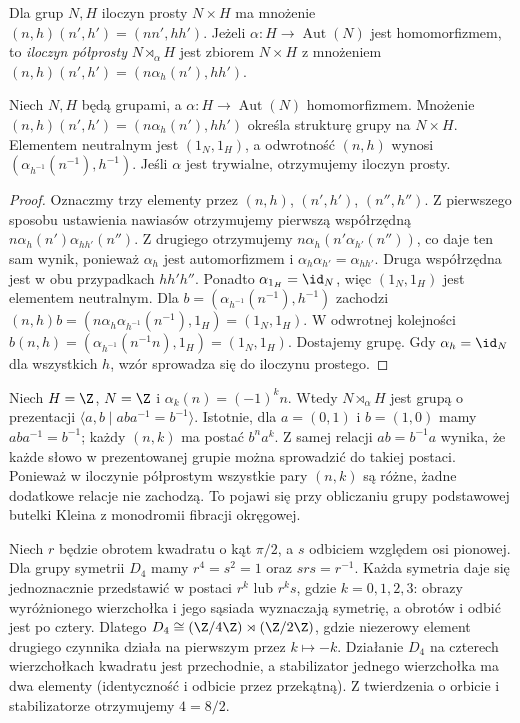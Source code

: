 \begin{definicja}
Dla grup $N,H$ iloczyn prosty $N\times H$ ma mnożenie
$(n,h)(n',h')=(nn',hh')$. Jeżeli
$\alpha:H\to\operatorname{Aut}(N)$ jest homomorfizmem,
to \emph{iloczyn półprosty} $N\rtimes_\alpha H$ jest zbiorem
$N\times H$ z mnożeniem
$(n,h)(n',h')=(n\alpha_h(n'),hh')$.
\end{definicja}
\begin{stwierdzenie}
Niech $N,H$ będą grupami, a
$\alpha:H\to\operatorname{Aut}(N)$ homomorfizmem.
Mnożenie $(n,h)(n',h')=(n\alpha_h(n'),hh')$
określa strukturę grupy na $N\times H$.
Elementem neutralnym jest $(1_N,1_H)$,
a odwrotność $(n,h)$ wynosi
$(\alpha_{h^{-1}}(n^{-1}),h^{-1})$.
Jeśli $\alpha$ jest trywialne, otrzymujemy iloczyn prosty.
\end{stwierdzenie}
\begin{proof}
Oznaczmy trzy elementy przez $(n,h)$, $(n',h')$, $(n'',h'')$.
Z pierwszego sposobu ustawienia nawiasów otrzymujemy
pierwszą współrzędną
$n\alpha_h(n')\alpha_{hh'}(n'')$.
Z drugiego otrzymujemy
$n\alpha_h(n'\alpha_{h'}(n''))$, co daje ten sam wynik,
ponieważ $\alpha_h$ jest automorfizmem i
$\alpha_h\alpha_{h'}=\alpha_{hh'}$.
Druga współrzędna jest w obu przypadkach $hh'h''$.
Ponadto $\alpha_{1_H}=\id_N$, więc $(1_N,1_H)$
jest elementem neutralnym.
Dla $b=(\alpha_{h^{-1}}(n^{-1}),h^{-1})$ zachodzi
$(n,h)b=(n\alpha_h\alpha_{h^{-1}}(n^{-1}),1_H)
=(1_N,1_H)$.
W odwrotnej kolejności
$b(n,h)=(\alpha_{h^{-1}}(n^{-1}n),1_H)=(1_N,1_H)$.
Dostajemy grupę. Gdy $\alpha_h=\id_N$ dla wszystkich $h$,
wzór sprowadza się do iloczynu prostego.
\end{proof}
\begin{przyklad}
Niech $H=\Z$, $N=\Z$ i $\alpha_k(n)=(-1)^k n$. Wtedy
$N\rtimes_\alpha H$ jest grupą o prezentacji
$\langle a,b\mid aba^{-1}=b^{-1}\rangle$.
Istotnie, dla $a=(0,1)$ i $b=(1,0)$ mamy
$aba^{-1}=b^{-1}$; każdy $(n,k)$ ma postać $b^na^k$.
Z samej relacji $ab=b^{-1}a$ wynika, że każde słowo
w prezentowanej grupie można sprowadzić do takiej postaci.
Ponieważ w iloczynie półprostym wszystkie pary $(n,k)$
są różne, żadne dodatkowe relacje nie zachodzą.
To pojawi się przy obliczaniu grupy podstawowej butelki Kleina
z monodromii fibracji okręgowej.
\end{przyklad}

\begin{przyklad}
\label{prz:dihedral-top-algebra}
Niech $r$ będzie obrotem kwadratu o kąt $\pi/2$,
a $s$ odbiciem względem osi pionowej.
Dla grupy symetrii $D_4$ mamy
$r^4=s^2=1$ oraz $srs=r^{-1}$.
Każda symetria daje się jednoznacznie przedstawić
w postaci $r^k$ lub $r^ks$, gdzie $k=0,1,2,3$:
obrazy wyróżnionego wierzchołka i jego sąsiada
wyznaczają symetrię, a obrotów i odbić jest po cztery.
Dlatego $D_4\cong(\Z/4\Z)\rtimes(\Z/2\Z)$,
gdzie niezerowy element drugiego czynnika działa
na pierwszym przez $k\mapsto-k$.
Działanie $D_4$ na czterech wierzchołkach kwadratu
jest przechodnie, a stabilizator jednego wierzchołka
ma dwa elementy (identyczność i odbicie przez przekątną).
Z twierdzenia o orbicie i stabilizatorze otrzymujemy
$4=8/2$.
\end{przyklad}

